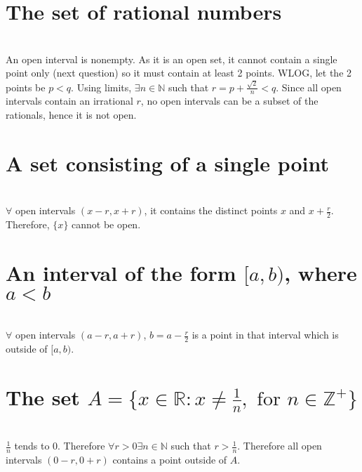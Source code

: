 \begin{parts}
 
 \part{The set of rational numbers}
 
 
\begin{solution}
 \\An open interval is nonempty. As it is an open set, it cannot contain a single point only (next question) so it must contain at least 2 points. WLOG, let the 2 points be $p < q$. Using limits, $\exists n \in \mathbb{N}$ such that $r = p + \frac{\sqrt{2}}{n} < q$. Since all open intervals contain an irrational $r$, no open intervals can be a subset of the rationals, hence it is not open.
\end{solution}

 \part{A set consisting of a single point}
 
 
\begin{solution}
 \\$\forall$ open intervals $(x-r,x+r)$, it contains the distinct points $x$ and $x+\frac{r}{2}$. Therefore, $\{x\}$ cannot be open.
\end{solution}

 \part{An interval of the form $[a,b)$, where $a < b$}
 
 
\begin{solution}
\\ $\forall$ open intervals $(a-r,a+r)$, $b=a-\frac{r}{2}$ is a point in that interval which is outside of $[a,b)$.
\end{solution}

 \part{The set $A = \{x\in\mathbb{R}:x\neq\frac{1}{n},\text{ for }n\in\mathbb{Z}^+\}$}
 
 
\begin{solution}
\\ $\frac{1}{n}$ tends to 0. Therefore $\forall r > 0 \exists n \in \mathbb{N}$ such that $r > \frac{1}{n}$. Therefore all open intervals $(0-r,0+r)$ contains a point outside of $A$.
\end{solution}
\end{parts}
